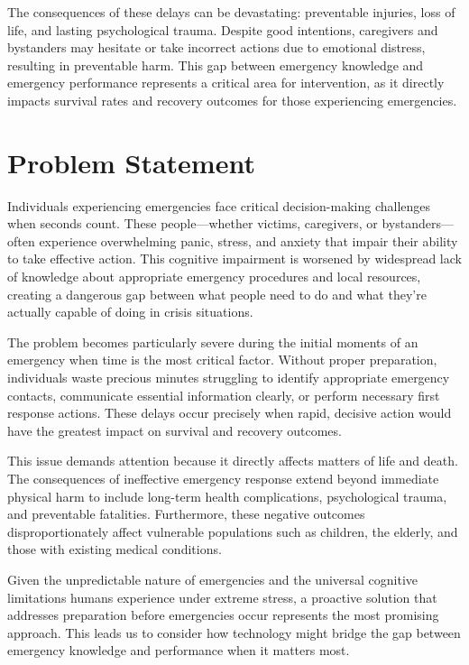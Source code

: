 The consequences of these delays can be devastating: preventable injuries, loss of life, and lasting psychological trauma. Despite good intentions, caregivers and bystanders may hesitate or take incorrect actions due to emotional distress, resulting in preventable harm. This gap between emergency knowledge and emergency performance represents a critical area for intervention, as it directly impacts survival rates and recovery outcomes for those experiencing emergencies.

\section{Problem Statement}
\label{section:problem-statement}

Individuals experiencing emergencies face critical decision-making challenges when seconds count. These people—whether victims, caregivers, or bystanders—often experience overwhelming panic, stress, and anxiety that impair their ability to take effective action. This cognitive impairment is worsened by widespread lack of knowledge about appropriate emergency procedures and local resources, creating a dangerous gap between what people need to do and what they're actually capable of doing in crisis situations.

The problem becomes particularly severe during the initial moments of an emergency when time is the most critical factor. Without proper preparation, individuals waste precious minutes struggling to identify appropriate emergency contacts, communicate essential information clearly, or perform necessary first response actions. These delays occur precisely when rapid, decisive action would have the greatest impact on survival and recovery outcomes.

This issue demands attention because it directly affects matters of life and death. The consequences of ineffective emergency response extend beyond immediate physical harm to include long-term health complications, psychological trauma, and preventable fatalities. Furthermore, these negative outcomes disproportionately affect vulnerable populations such as children, the elderly, and those with existing medical conditions.

Given the unpredictable nature of emergencies and the universal cognitive limitations humans experience under extreme stress, a proactive solution that addresses preparation before emergencies occur represents the most promising approach. This leads us to consider how technology might bridge the gap between emergency knowledge and performance when it matters most.


